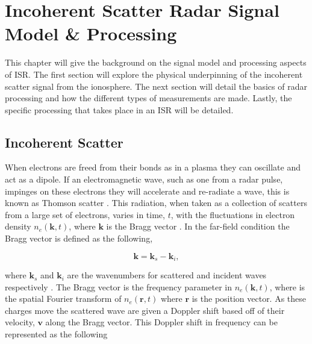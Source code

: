 \chapter{Incoherent Scatter Radar Signal Model \& Processing}
\label{chapter:isrproc}
\thispagestyle{myheadings}

\graphicspath{{2_ISRProc/Figures/}}


This chapter will give the background on the signal model and processing aspects of ISR. The first section will explore the physical  underpinning of the incoherent scatter signal from the ionosphere. The next section will detail the basics of radar processing and how the different types of measurements are made. Lastly, the specific processing that takes place in an ISR will be detailed.

\section{Incoherent Scatter}

When electrons are freed from their bonds as in a plasma they can oscillate and act as a dipole. If an electromagnetic wave, such as one from a radar pulse, impinges on these electrons they will accelerate and re-radiate a wave, this is known as Thomson scatter \cite{Hutchinson_2002}. This radiation, when taken as a collection of scatters from a large set of electrons, varies in time, $t$, with the fluctuations in electron density $n_e(\mathbf{k},t)$, where $\mathbf{k}$ is the Bragg vector \cite{kudeki:milla:1}. In the far-field condition the Bragg vector is defined as the following,

\begin{equation}
\label{eqn:bragg}
\mathbf{k}=\mathbf{k}_s-\mathbf{k}_i,
\end{equation}

\noindent where $\mathbf{k}_s$ and $\mathbf{k}_i$ are the wavenumbers for scattered and incident waves respectively \cite{sheffield2010}. The Bragg vector is the frequency parameter in $n_e(\mathbf{k},t)$, where is the spatial Fourier transform of $n_e(\mathbf{r},t)$ where $\mathbf{r}$ is the position vector. As these charges move the scattered wave are given a Doppler shift based off of their velocity, $\mathbf{v}$ along the Bragg vector. This Doppler shift in frequency can be represented as the following 

